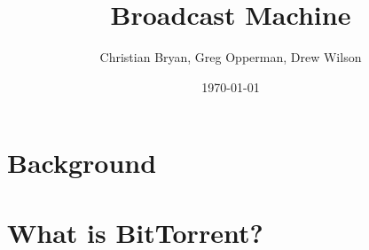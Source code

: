 \documentclass[a4paper,12pt]{report}
\author{Christian Bryan, Greg Opperman, Drew Wilson}
\date{\today}
\title{Broadcast Machine}
\begin{document}
\maketitle

\tableofcontents

\chapter{Background}

\begin{comment}
* Importance of open media and an open internet for open media.
	* A brief history of the software and PCF.
	* How Broadcast Machine relates to similar software such as:
		> WordPress
		> Drupal
		> YouTube
	* Why Broadcast Machine will be built in PHP/MySQL versus Ruby on Rails, J2EE, and other PHP frameworks.
\end{comment}

\chapter{What is BitTorrent?}
\end{document}
